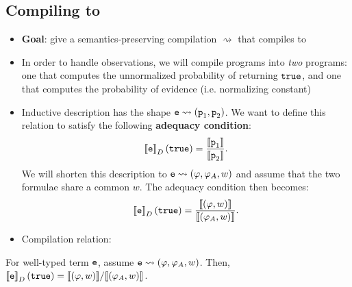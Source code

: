 \documentclass{tufte-handout}
\begin{document}
\subsection{Compiling \disc{} to \prop{}}
\begin{itemize}
  \item \textbf{Goal}: give a semantics-preserving compilation
  $\rightsquigarrow$ that compiles \disc{} to \prop{}
  \item In order to handle observations, we will compile \disc{} programs into 
  \emph{two} \prop{} programs: one that computes the unnormalized probability of 
  returning $\texttt{true}$, and one that computes the probability of evidence (i.e. normalizing constant)
  \item Inductive description has the shape $\texttt{e} \rightsquigarrow (\texttt{p}_1, \texttt{p}_2)$. We want to 
  define this relation to satisfy the following \textbf{adequacy condition}:
  \begin{align} 
    \left \llbracket {\texttt{e}} \right \rrbracket_D(\texttt{true}) = \frac{\left \llbracket {\texttt{p}_1} \right \rrbracket}{\left \llbracket {\texttt{p}_2} \right \rrbracket}.
  \end{align} 
  We will shorten this description to $\texttt{e} \rightsquigarrow
  (\varphi, \varphi_A, w)$ and assume that the two formulae share a common
  $w$. The adequacy condition then becomes:
  \begin{align} 
    \left \llbracket {\texttt{e}} \right \rrbracket_D(\texttt{true}) = \frac{\left \llbracket {(\varphi, w)} \right \rrbracket}{\left \llbracket {(\varphi_A, w)} \right \rrbracket}.
  \end{align} 
  \item Compilation relation:

\end{itemize}
\begin{theorem}[Adequacy]
  For well-typed term $\texttt{e}$,
  assume $\texttt{e} \rightsquigarrow (\varphi, \varphi_A, w)$. Then, 
  $\left \llbracket {\texttt{e}} \right \rrbracket_D(\texttt{true}) = {\left \llbracket {(\varphi, w)} \right \rrbracket} / {\left \llbracket {(\varphi_A, w)} \right \rrbracket}$.
\end{theorem}
\end{document}
